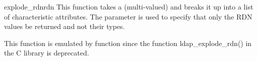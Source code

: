 \begin{funcdesc}{explode_rdn}{rdn } %
  This function takes a (multi-valued)  and breaks it up
  into a list of characteristic attributes. The
   parameter is used to specify that only the RDN values be 
  returned and not their types.

  This function is emulated by function 
  since the function ldap_explode_rdn() in the C library is deprecated.
\end{funcdesc}

